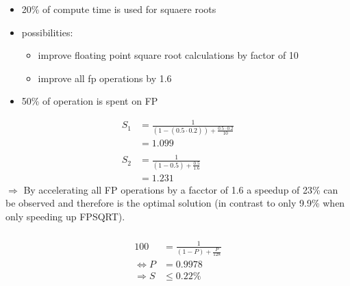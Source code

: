 \documentclass[]{scrartcl}
\begin{document}
\subsubsection{}
\begin{itemize}
    \item 20\% of compute time is used for squaere roots
    \item possibilities:
        \begin{itemize}
            \item improve floating point square root calculations by factor of 10
            \item improve all fp operations by 1.6
        \end{itemize}
    \item 50\% of operation is spent on FP
\end{itemize}
\begin{align}
    S_1 &= \frac{1}{(1-(0.5\cdot 0.2))+\frac{0.5\cdot0.2}{10}}\\
        &= 1.099\\\nonumber\\
    S_2 &= \frac{1}{(1-0.5)+\frac{0.5}{1.6}}\\
        &= 1.231
\end{align}
$\Rightarrow$ By accelerating all FP operations by a facctor of 1.6 a speedup of 23\% can be observed and therefore is the optimal solution (in contrast to only 9.9\% when only speeding up FPSQRT).

\subsubsection{}
\begin{align}
    100 &= \frac{1}{(1-P)+\frac{P}{128}}\\
    \Leftrightarrow P&= 0.9978\\
    \Rightarrow S &\leq 0.22\%
\end{align}
\end{document}
